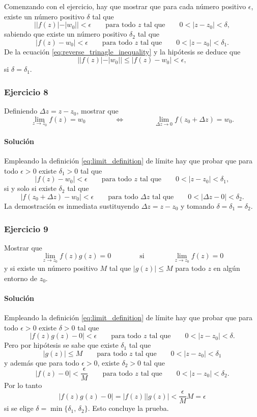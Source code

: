 \documentclass[a4paper]{report}
\begin{document}
Comenzando con el ejercicio, hay que mostrar que para cada número positivo \(\epsilon\), existe un número positivo \(\delta\) tal que
\[
 ||f(z)|-|w_0||<\epsilon\qquad\textrm{para todo }z\textrm{ tal que}\qquad0<|z-z_0|<\delta, 
\]
sabiendo que existe un número positivo \(\delta_2\) tal que
\[
 |f(z)-w_0|<\epsilon\qquad\textrm{para todo }z\textrm{ tal que}\qquad0<|z-z_0|<\delta_1. 
\]
De la ecuación \ref{eq:reverse_trinagle_inequality} y la hipótesis se deduce que  
\[
 ||f(z)|-|w_0||\leq|f(z)-w_0|<\epsilon,
\]
si \(\delta=\delta_1\).

\subsubsection{Ejercicio 8}

Definiendo \(\Delta z=z-z_0\), mostrar que 
\[
 \lim_{z\to z_0}f(z)=w_0
 \qquad\qquad\Leftrightarrow\qquad\qquad
 \lim_{\Delta z\to 0}f(z_0+\Delta z)=w_0.
\]

\paragraph{Solución} Empleando la definición \ref{eq:limit_definition} de límite hay que probar que para todo \(\epsilon>0\) existe \(\delta_1>0\) tal que
\[
 |f(z)-w_0|<\epsilon\qquad\textrm{para todo }z\textrm{ tal que}\qquad0<|z-z_0|<\delta_1, 
\]
si y solo si existe \(\delta_2\) tal que
\[
 |f(z_0+\Delta z)-w_0|<\epsilon\qquad\textrm{para todo }\Delta z\textrm{ tal que}\qquad0<|\Delta z-0|<\delta_2. 
\]
La demostración es inmediata sustituyendo \(\Delta z=z-z_0\) y tomando \(\delta=\delta_1=\delta_2\). 

\subsubsection{Ejercicio 9} 

Mostrar que 
\[
 \lim_{z\to z_0}f(z)g(z)=0
  \qquad\qquad\textrm{si}\qquad\qquad
 \lim_{z\to z_0}f(z)=0 
\]
y si existe un número positivo \(M\) tal que \(|g(z)|\leq M\) para todo \(z\) en algún entorno de \(z_0\).

\paragraph{Solución} Empleando la definición \ref{eq:limit_definition} de límite hay que probar que para todo \(\epsilon>0\) existe \(\delta>0\) tal que
\[
 |f(z)g(z)-0|<\epsilon\qquad\textrm{para todo }z\textrm{ tal que}\qquad0<|z-z_0|<\delta. 
\]
Pero por hipótesis se sabe que existe \(\delta_1\) tal que 
\[
 |g(z)|\leq M\qquad\textrm{para todo }z\textrm{ tal que}\qquad0<|z-z_0|<\delta_1
\]
y además que para todo \(\epsilon>0\), existe \(\delta_2>0\) tal que 
\[
 |f(z)-0|<\frac{\epsilon}{M}\qquad\textrm{para todo }z\textrm{ tal que}\qquad0<|z-z_0|<\delta_2. 
\]
Por lo tanto
\[
 |f(z)g(z)-0|=|f(z)||g(z)|<\frac{\epsilon}{M}M=\epsilon
\]
si se elige \(\delta=\min\{\delta_1,\,\delta_2\}\). Esto concluye la prueba.
\end{document}
